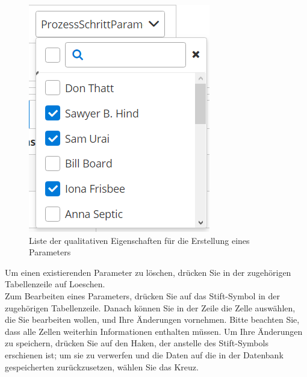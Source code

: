 \documentclass[enabledeprecatedfontcommands,fontsize=12pt,paper=a4,twoside]{scrartcl}
\begin{document}
\begin{figure}[h!]
\begin{center}
 \includegraphics[width=\textwidth]{screenshots/pk/parameterliste.png}
  \caption{Liste der qualitativen Eigenschaften für die Erstellung eines Parameters}
  \label{fig:boat2}
\end{center}
\end{figure}

Um einen existierenden Parameter zu löschen, drücken Sie in der zugehörigen Tabellenzeile auf Loeschen. \\

Zum Bearbeiten eines Parameters, drücken Sie auf das Stift-Symbol in der zugehörigen Tabellenzeile. Danach können Sie in der Zeile die Zelle auswählen, die Sie bearbeiten wollen, und Ihre Änderungen vornehmen. Bitte beachten Sie, dass alle Zellen weiterhin Informationen enthalten müssen. Um Ihre Änderungen zu speichern, drücken Sie auf den Haken, der anstelle des Stift-Symbols erschienen ist; um sie zu verwerfen und die Daten auf die in der Datenbank gespeicherten zurückzusetzen, wählen Sie das Kreuz. \\
\end{document}
